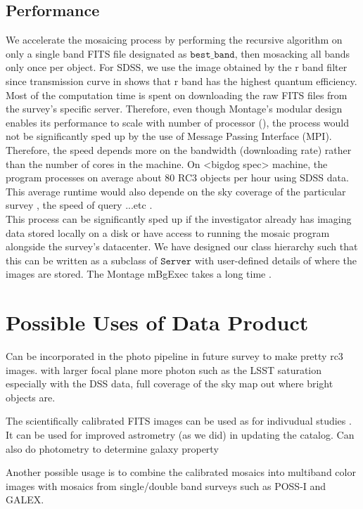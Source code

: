 \documentclass[5p]{elsarticle}
\begin{document}
	\subsection{Performance}	
	\indent We accelerate the mosaicing process by performing the recursive algorithm on only a single band FITS file designated as $\texttt{best\_band}$, then mosacking all bands only once per object. For SDSS, we use the image obtained by the r band filter since transmission curve in \citet{edr} shows that r band has the highest quantum efficiency. 
	\\ \indent  Most of the computation time is spent on downloading the raw FITS files from the survey's specific server. Therefore, even though Montage's modular design enables its performance to scale with number of processor  (\citet{montage}), the process would not be significantly sped up by the use of Message Passing Interface (MPI). Therefore, the speed depends more on the bandwidth (downloading rate) rather than the number of cores in the machine. On <bigdog spec> machine, the program processes on average about 80 RC3 objects per hour using SDSS data. This average runtime would also depende on the sky coverage of the  particular survey , the speed of query ...etc . 
	\\ \indent This process can  be significantly sped up if the investigator already has imaging data stored locally on a disk or have access to running the mosaic program alongside the survey's datacenter. We have designed our class hierarchy such that this can be written as a subclass of $\texttt{Server}$ with user-defined details of where the images are stored.
The Montage 	mBgExec takes a long time . 

\section{Possible Uses of Data Product}
Can be incorporated in the photo pipeline in future survey to make pretty rc3 images.
with larger focal plane 
more photon
such as the LSST
saturation
especially with the DSS data, full coverage of the sky
map out where bright objects are. 


The scientifically calibrated FITS images can be used as for indivudual studies . It can be used for improved astrometry (as we did) in updating the catalog. Can also do photometry to determine galaxy property

Another possible usage is to combine the calibrated mosaics into multiband color images with mosaics from single/double band surveys such as POSS-I and GALEX.
\end{document}
